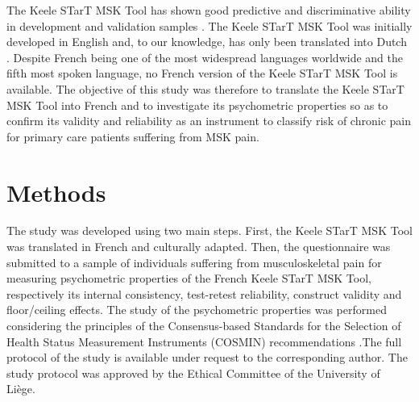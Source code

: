 The Keele STarT MSK Tool has shown good predictive and discriminative ability in development and validation samples \citep{dunn2021refinement,hill2016does}. The Keele STarT MSK Tool was initially developed in English and, to our knowledge, has only been translated into Dutch \citep{van2021validity}. Despite French being one of the most widespread languages worldwide and the fifth most spoken language, no French version of the Keele STarT MSK Tool is available. The objective of this study was therefore to translate the Keele STarT MSK Tool into French and to investigate its psychometric properties so as to confirm its validity and reliability as an instrument to classify risk of chronic pain for primary care patients suffering from MSK pain.    


\section{Methods}
\label{sec:methods}

The study was developed using two main steps. First, the Keele STarT MSK Tool was translated in French and culturally adapted. Then, the questionnaire was submitted to a sample of individuals suffering from musculoskeletal pain for measuring psychometric properties of the French Keele STarT MSK Tool, respectively its internal consistency, test-retest reliability, construct validity and floor/ceiling effects. The study of the psychometric properties was performed considering the principles of the Consensus-based Standards for the Selection of Health Status Measurement Instruments (COSMIN) recommendations \citep{mokkink2016consensus}.The full protocol of the study is available under request to the corresponding author. The study protocol was approved by the Ethical Committee of the University of Liège.\\
\medbreak
